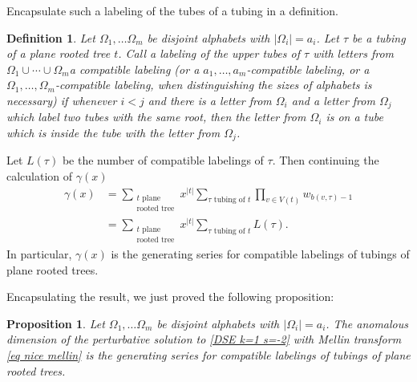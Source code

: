 \documentclass[oneside]{amsart}
\newtheorem{prop}[thm]{Proposition}
\newtheorem{definition}[thm]{Definition}
\theoremstyle{definition}
\begin{document}
Encapsulate such a labeling of the tubes of a tubing in a definition.
\begin{definition}
  Let $\Omega_1, \ldots \Omega_m$ be disjoint alphabets with $|\Omega_i|=a_i$.  
  Let $\tau$ be a tubing of a plane rooted tree $t$.  Call a labeling of the upper tubes of $\tau$ with letters from $\Omega_1\cup \cdots \cup \Omega_m$a \emph{compatible labeling} (or a $a_1, \ldots, a_m$-compatible labeling, or a $\Omega_1, \ldots, \Omega_m$-compatible labeling, when distinguishing the sizes of alphabets is necessary) if whenever $i<j$ and there is a letter from $\Omega_i$ and a letter from $\Omega_j$ which label two tubes with the same root, then the letter from $\Omega_i$ is on a tube which is inside the tube with the letter from $\Omega_j$.
\end{definition}
Let $L(\tau)$ be the number of compatible labelings of $\tau$.
Then continuing the calculation of $\gamma(x)$
\begin{align*} \gamma(x) & = \sum_{\substack{t \text{ plane }\\\text{rooted tree}}} x^{|t|} \sum_{\tau \text{ tubing of }t} \prod_{v\in V(t)} w_{b(v,\tau)-1} \\
 & = \sum_{\substack{t \text{ plane }\\\text{rooted tree}}} x^{|t|} \sum_{\tau \text{ tubing of }t} L(\tau). \end{align*}
In particular, $\gamma(x)$ is the generating series for compatible labelings of tubings of plane rooted trees.

Encapsulating the result, we just proved the following proposition:
\begin{prop}\label{prop nice mellin result}
  Let $\Omega_1, \ldots \Omega_m$ be disjoint alphabets with $|\Omega_i|=a_i$.  The anomalous dimension of the perturbative solution to \eqref{DSE k=1 s=-2} with Mellin transform \eqref{eq nice mellin} is the generating series for compatible labelings of tubings of plane rooted trees.
\end{prop}
\end{document}
